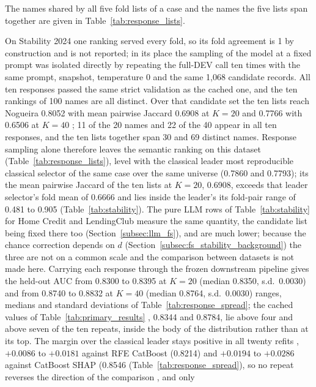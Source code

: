 \documentclass[final,5p,twocolumn]{elsarticle}
\newcommand{\Kfeat}{K}
\providecommand{\DIFaddtex}[1]{{\protect\color{blue} \sf #1}} %
\providecommand{\DIFdeltex}[1]{{\protect\color{red} \scriptsize #1}} %
\providecommand{\DIFaddbegin}{} %
\providecommand{\DIFaddend}{} %
\providecommand{\DIFdelbegin}{} %
\providecommand{\DIFdelend}{} %
\providecommand{\DIFadd}[1]{\texorpdfstring{\DIFaddtex{#1}}{#1}} %
\providecommand{\DIFdel}[1]{\texorpdfstring{\DIFdeltex{#1}}{}} %
\begin{document}
{}\DIFdelend \DIFaddbegin \DIFadd{The names shared by all five fold lists of a case and the names the five lists span together are given in Table~\ref{tab:response_lists}.
}

\DIFaddend On Stability 2024 one ranking served every fold, so its fold agreement is 1 by construction and is not reported; in its place the sampling of the model at a fixed prompt was isolated directly by repeating the full-DEV call ten times with the same prompt, snapshot, temperature 0 and the same 1,068 candidate records. All ten responses passed the same strict validation as the cached one, and the ten rankings of 100 names are all distinct. Over that candidate set the ten lists reach Nogueira 0.8052 \DIFdelbegin \DIFdel{with mean pairwise Jaccard 0.6908 }\DIFdelend at $\Kfeat=20$ and 0.7766 \DIFdelbegin \DIFdel{with 0.6506 }\DIFdelend at $\Kfeat=40$ \DIFdelbegin \DIFdel{; 11 of the 20 names and 22 of the 40 appear in all ten responses, and the ten lists together span 30 and 69 distinct names. Response sampling alone therefore leaves the semantic ranking on this dataset }\DIFdelend \DIFaddbegin \DIFadd{(Table~\ref{tab:response_lists}), }\DIFaddend level with the \DIFdelbegin \DIFdel{classical leader }\DIFdelend \DIFaddbegin \DIFadd{most reproducible classical selector }\DIFaddend of the same case over the same universe (0.7860 and 0.7793); \DIFdelbegin \DIFdel{its }\DIFdelend \DIFaddbegin \DIFadd{the }\DIFaddend mean pairwise Jaccard \DIFaddbegin \DIFadd{of the ten lists }\DIFaddend at $\Kfeat=20$, 0.6908, exceeds that \DIFdelbegin \DIFdel{leader}\DIFdelend \DIFaddbegin \DIFadd{selector}\DIFaddend 's fold mean of 0.6666 and lies inside \DIFdelbegin \DIFdel{the leader's }\DIFdelend \DIFaddbegin \DIFadd{its }\DIFaddend fold-pair range \DIFdelbegin \DIFdel{of 0.481 to 0.905}\DIFdelend \DIFaddbegin \DIFadd{(Table~\ref{tab:stability})}\DIFaddend . The pure LLM rows \DIFaddbegin \DIFadd{of Table~\ref{tab:stability} }\DIFaddend for Home Credit and LendingClub measure the same quantity, the candidate list being fixed there too (Section~\ref{subsec:llm_fs}), and are much lower; because the chance correction depends on $d$ (Section~\ref{subsec:fs_stability_background}) the three are not on a common scale and the comparison between datasets is not made here. Carrying each response through the frozen downstream pipeline gives \DIFaddbegin \DIFadd{the }\DIFaddend held-out AUC \DIFdelbegin \DIFdel{from 0.8300 to 0.8395 at $\Kfeat=20$ (median 0.8350, s.d.\ 0.0030) and from 0.8740 to 0.8832 at $\Kfeat=40$ (median 0.8764, s.d.\ 0.0030)}\DIFdelend \DIFaddbegin \DIFadd{ranges, medians and standard deviations of Table~\ref{tab:response_spread}}\DIFaddend ; the cached values of Table~\ref{tab:primary_results} \DIFdelbegin \DIFdel{, 0.8344 and 0.8784, }\DIFdelend lie above four and above seven of the ten repeats, inside the body of the distribution rather than at its top. The margin over the classical leader stays positive in all twenty refits \DIFdelbegin \DIFdel{, $+0.0086$ to $+0.0181$ against RFE CatBoost (0.8214) and $+0.0194$ to $+0.0286$ against CatBoost SHAP (0.8546}\DIFdelend \DIFaddbegin \DIFadd{(Table~\ref{tab:response_spread}}\DIFaddend ), so no repeat reverses the direction of the comparison\DIFdelbegin \DIFdel{, and only }\DIFdelend 
\end{document}
